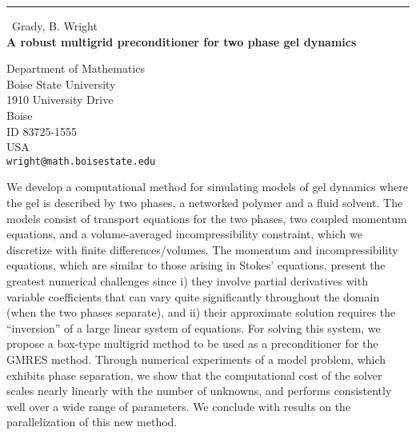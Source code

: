 \documentclass{report}
\begin{document}
\begin{center}
\rule{6in}{1pt} \
{\large Grady, B. Wright \\
{\bf A robust multigrid preconditioner for two phase gel dynamics}}

Department of Mathematics \\ Boise State University \\ 1910 University Drive \\ Boise \\ ID 83725-1555 \\ USA
\\
{\tt wright@math.boisestate.edu}\end{center}

We develop a computational method for simulating models of gel dynamics
where the gel is described by two phases, a networked polymer and a fluid
solvent. The models consist of transport equations for the two phases,
two coupled momentum equations, and a volume-averaged incompressibility
constraint, which we discretize with finite differences/volumes. The
momentum and incompressibility equations, which are similar to those
arising in Stokes' equations, present the greatest numerical challenges
since i) they involve partial derivatives with variable coefficients that
can vary quite significantly throughout the domain (when the two phases
separate), and ii) their approximate solution requires the ``inversion''
of a large linear system of equations. For solving this system, we
propose a box-type multigrid method to be used as a preconditioner for
the GMRES method. Through numerical experiments of a model problem, which
exhibits phase separation, we show that the computational cost of the
solver scales nearly linearly with the number of unknowns, and performs
consistently well over a wide range of parameters. We conclude with
results on the parallelization of this new method.
\end{document}
